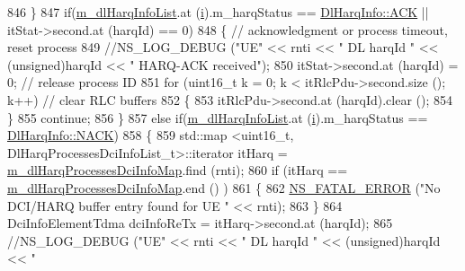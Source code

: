 \begin{DoxyCode}
846                         \}
847                         \textcolor{keywordflow}{if}(\hyperlink{classns3_1_1MmWaveFlexTtiPfMacScheduler_a71cf056c010c970921c28871ed145af0}{m\_dlHarqInfoList}.at (\hyperlink{bernuolliDistribution_8m_a6f6ccfcf58b31cb6412107d9d5281426}{i}).m\_harqStatus == 
      \hyperlink{structns3_1_1DlHarqInfo_a922d2bc13ae01f93cde1a8b4bfccad14a8d3ab99ad8902cfbc5929336966de3ef}{DlHarqInfo::ACK} || itStat->second.at (harqId) == 0)
848                         \{ \textcolor{comment}{// acknowledgment or process timeout, reset process}
849                                 \textcolor{comment}{//NS\_LOG\_DEBUG ("UE" << rnti << " DL harqId " << (unsigned)harqId << "
       HARQ-ACK received");}
850                                 itStat->second.at (harqId) = 0;    \textcolor{comment}{// release process ID}
851                                 \textcolor{keywordflow}{for} (uint16\_t k = 0; k < itRlcPdu->second.size (); k++)         \textcolor{comment}{// clear
       RLC buffers}
852                                 \{
853                                         itRlcPdu->second.at (harqId).clear ();
854                                 \}
855                                 \textcolor{keywordflow}{continue};
856                         \}
857                         \textcolor{keywordflow}{else} \textcolor{keywordflow}{if}(\hyperlink{classns3_1_1MmWaveFlexTtiPfMacScheduler_a71cf056c010c970921c28871ed145af0}{m\_dlHarqInfoList}.at (\hyperlink{bernuolliDistribution_8m_a6f6ccfcf58b31cb6412107d9d5281426}{i}).m\_harqStatus == 
      \hyperlink{structns3_1_1DlHarqInfo_a922d2bc13ae01f93cde1a8b4bfccad14ae0560b883a5e22a4d4c40ac562e80374}{DlHarqInfo::NACK})
858                         \{
859                                 std::map <uint16\_t, DlHarqProcessesDciInfoList\_t>::iterator itHarq = 
      \hyperlink{classns3_1_1MmWaveFlexTtiPfMacScheduler_a409de362c5e49fc6956b26ee2644db4d}{m\_dlHarqProcessesDciInfoMap}.find (rnti);
860                                 \textcolor{keywordflow}{if} (itHarq == \hyperlink{classns3_1_1MmWaveFlexTtiPfMacScheduler_a409de362c5e49fc6956b26ee2644db4d}{m\_dlHarqProcessesDciInfoMap}.end ()
      )
861                                 \{
862                                         \hyperlink{group__fatal_ga5131d5e3f75d7d4cbfd706ac456fdc85}{NS\_FATAL\_ERROR} (\textcolor{stringliteral}{"No DCI/HARQ buffer entry found for
       UE "} << rnti);
863                                 \}
864                                 DciInfoElementTdma dciInfoReTx = itHarq->second.at (harqId);
865                                 \textcolor{comment}{//NS\_LOG\_DEBUG ("UE" << rnti << " DL harqId " << (unsigned)harqId << "
}
\end{DoxyCode}
